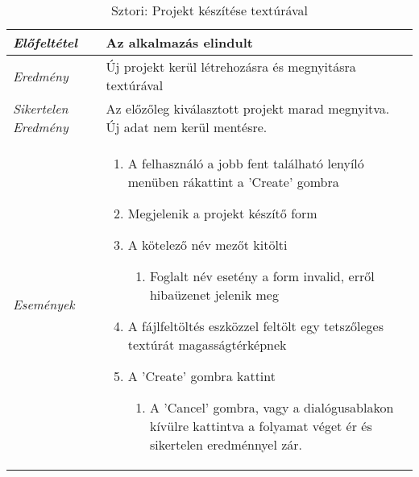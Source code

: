 \begin{table}[H]
	\centering
	\begin{tabular}{ | m{} | m{} | }
		\hline
		\emph{Előfeltétel} & Az alkalmazás elindult  \\
		\hline
		\emph{Eredmény} & Új projekt kerül létrehozásra és megnyitásra textúrával  \\
		\hline
		\emph{Sikertelen Eredmény} & Az előzőleg kiválasztott projekt marad megnyitva. Új adat nem kerül mentésre.  \\
		\hline
		\emph{Események} &

		\begin{enumerate}
			\item A felhasználó a jobb fent található lenyíló menüben rákattint a 'Create' gombra
			\item Megjelenik a projekt készítő form
			\item A kötelező név mezőt kitölti
			\begin{enumerate}
				\item Foglalt név esetény a form invalid, erről hibaüzenet jelenik meg
			\end{enumerate}
			\item A fájlfeltöltés eszközzel feltölt egy tetszőleges textúrát magasságtérképnek
			\item A 'Create' gombra kattint
			\begin{enumerate}
				\item A 'Cancel' gombra, vagy a dialógusablakon kívülre kattintva a folyamat véget ér és sikertelen eredménnyel zár.
			\end{enumerate}
		\end{enumerate}

		\\
		\hline
	\end{tabular}
	\caption{Sztori: Projekt készítése textúrával}
	\label{tab:story-project-create-texture}
\end{table}

